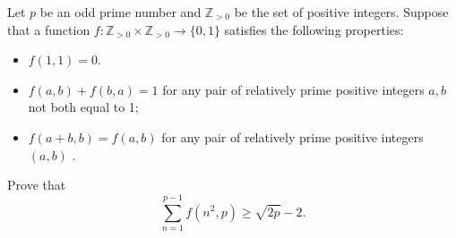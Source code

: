 Let 
$p$
 be an odd prime number and 
$\mathbb{Z}_{ >0}$
 be the set of positive integers. Suppose that
a function 
$f:\mathbb{Z}_{ >0}\times\mathbb{Z}_{ >0}\to\{0,1\}$
 satisfies the following properties:

\begin{itemize}
    \item $f(1,1)=0$.
    
    \item $f(a,b)+f(b,a)=1$
    for any pair of relatively prime positive integers 
    $a,b$
    not both equal to 1;

    \item $f(a+b,b)=f(a,b)$
    for any pair of relatively prime positive integers 
    $(a,b)$    .
\end{itemize}

Prove that
$$\sum_{n=1}^{p-1}f(n^2,p) \geqslant \sqrt{2p}-2.$$